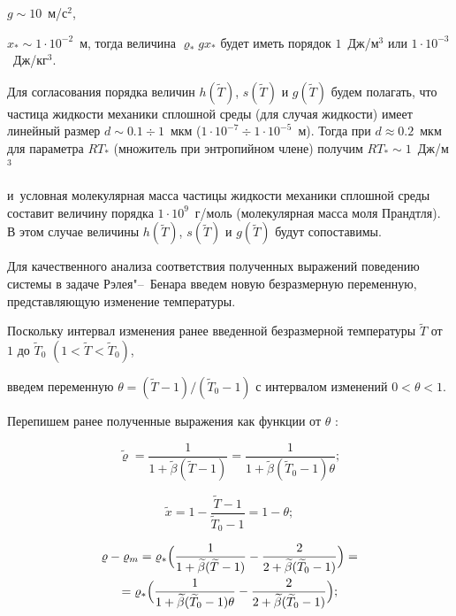 $g\sim 10$~м/с$^2$, 

$x_*\sim 1\cdot 10^{-2}$~м, тогда величина $\varrho_* g x_*$ будет иметь порядок $1$~Дж/м$^3$   или $1\cdot 10^{-3}$~Дж/кг$^3$.



Для согласования порядка величин  $h(\widetilde{T})$, $s(\widetilde{T})$  и $g(\widetilde{T})$ будем полагать, что частица жидкости механики сплошной среды (для случая жидкости) имеет линейный размер $d\sim 0.1\div 1$~мкм ($1\cdot 10^{-7} \div 1\cdot 10^{-5}$~м). Тогда при $d\approx 0.2$~мкм для параметра  $RT_*$ (множитель при энтропийном члене) получим $RT_*\sim 1$~Дж/м$^3$ 

и~условная молекулярная масса частицы жидкости механики сплошной среды составит величину  порядка \mbox{$ 1\cdot 10^9$~г/моль} (молекулярная масса моля Прандтля). В этом случае  величины $h(\widetilde{T})$, $s(\widetilde{T})$  и $g(\widetilde{T})$  будут сопоставимы.



Для качественного анализа соответствия полученных выражений поведению системы в задаче Рэлея"--~Бенара введем новую безразмерную переменную, представляющую изменение температуры.  

Поскольку интервал изменения ранее введенной безразмерной температуры  $\widetilde{T}$ от $1$ до $\widetilde{T}_0$ $(1<\widetilde{T}<\widetilde{T}_0)$,

введем переменную $\theta=({\widetilde{T}-1})/({\widetilde{T}_0-1})$ с интервалом изменений  $0<\theta<1$.



Перепишем ранее полученные выражения как функции от $\theta$ :

\begin{equation}

\widetilde{\varrho}=\frac1{1+\widetilde{\beta}(\widetilde{T}-1)}

=\frac1{1+\widetilde{\beta} (\widetilde{T}_0-1)\theta};\label{lukashev:N8}

\end{equation}

\begin{equation}

\widetilde{x}=1-\frac{\widetilde{T}-1}{\widetilde{T}_0-1}=1-\theta; \label{lukashev:N8}

\end{equation}

\begin{multline}

\label{lukashev:N9}

\varrho-\varrho_m=\varrho_*

\Bigl(\frac1{1+\widetilde{\beta}(\widetilde{T}-1)}-\frac2{2+\widetilde{\beta} (\widetilde{T}_0-1)}\Bigr)=\\

= 

\varrho_*\Bigl(\frac1{1+\widetilde{\beta} (\widetilde{T}_0-1)\theta}-\frac2{2+\widetilde{\beta} (\widetilde{T}_0-1)}\Bigr);

\end{multline}

